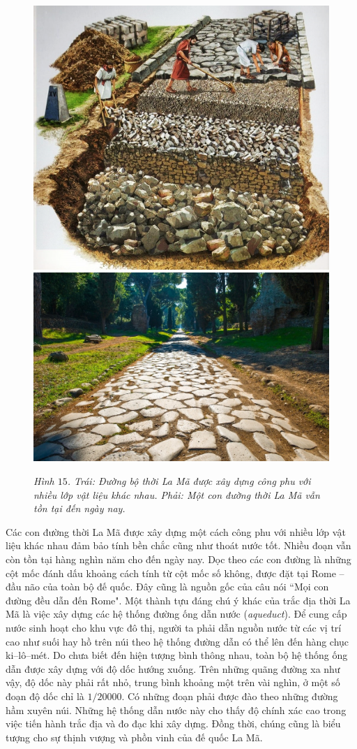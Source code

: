 \begin{multicols}{2}
	\begin{figure}[H]
		\vspace*{-5pt}
		\centering
		\captionsetup{labelformat= empty, justification=centering}
		\includegraphics[height= 0.36\linewidth]{15a}
		\includegraphics[height= 0.36\linewidth]{15b}
		\caption{\small\textit{\color{toanhocdoisong}Hình $15$. Trái: Đường bộ thời La Mã được xây dựng công phu với nhiều lớp vật liệu khác nhau. Phải: Một con đường thời La Mã vẫn tồn tại đến ngày nay.}}
		\vspace*{-10pt}
	\end{figure}
	Các con đường thời La Mã được xây dựng một cách công phu với nhiều lớp vật liệu khác nhau đảm bảo tính bền chắc cũng như thoát nước tốt. Nhiều đoạn vẫn còn tồn tại hàng nghìn năm cho đến ngày nay. Dọc theo các con đường là những cột mốc đánh dấu khoảng cách tính từ cột mốc số không, được đặt tại Rome -- đầu não của toàn bộ đế quốc. Đây cũng là nguồn gốc của câu nói ``Mọi con đường đều dẫn đến Rome".
	\vskip 0.1cm
	Một thành tựu đáng chú ý khác của trắc địa thời La Mã là việc xây dựng các hệ thống đường ống dẫn nước (\textit{aqueduct}). Để cung cấp nước sinh hoạt cho khu vực đô thị, người ta phải dẫn nguồn nước từ các vị trí cao như suối hay hồ trên núi theo hệ thống đường dẫn có thể lên đến hàng chục ki--lô--mét. Do chưa biết đến hiện tượng bình thông nhau, toàn bộ hệ thống ống dẫn được xây dựng với độ dốc hướng xuống. Trên những quãng đường xa như vậy, độ dốc này phải rất nhỏ, trung bình khoảng một trên vài nghìn, ở một số đoạn độ dốc chỉ là $1/20000$. Có những đoạn phải được đào theo những đường hầm xuyên núi. Những hệ thống dẫn nước này cho thấy độ chính xác cao trong việc tiến hành trắc địa và đo đạc khi xây dựng. Đồng thời, chúng cũng là biểu tượng cho sự thịnh vượng và phồn vinh của đế quốc La Mã.

\end{multicols}

